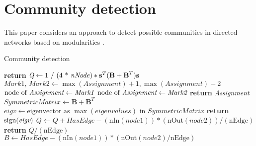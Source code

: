 \chapter[Short Chap title]{Community detection}
This paper considers an approach to detect possible communities in directed networks based on modularities \cite{PhysRevLett.100.118703}.

\begin{algorithm}[H]
	\caption{Community detection}\label{alg:communitydetection}
	\begin{algorithmic}[1]
		\State \textbf{return} \emph{$\textit{Q} \gets \text{1 / (4 * \textit{nNode})} * \textbf{s}^T(\textbf{B}+\textbf{B}^T)\textbf{s}$}
		\EndProcedure
		\State $\textit{Mark1, Mark2} \gets \max( \textit{Assignment})+1, \max( \textit{Assignment})+2$
		 {$\text{node of } \textit{Assignment} \gets \emph{Mark1}$}
		\EndIf
		 {$\text{node of } \textit{Assignment} \gets \emph{Mark2}$}
		\EndIf
		\EndFor
		\State \textbf{return} \emph{Assignment}
		\EndProcedure
		\State $\textit{SymmetricMatrix} \gets  \textbf{B}+\textbf{B}^T$
		\State $\textit{eigv} \gets \text{eigenvector as }\max(eigenvalues) \text{ in } \textit{SymmetricMatrix}$
		\State \textbf{return} $\operatorname{sign}(\textit{eigv})$
		\EndProcedure
		\State $Q \gets Q + HasEdge - (\text{nIn}( \textit{node1}))*(\text{nOut}(\textit{node2}))/ (\text{nEdge})$
		\EndIf
		\EndFor
		\EndFor
		\State \textbf{return} \emph{$Q / (\text{nEdge})$}
		\EndProcedure
		\State $\textit{B} \gets \textit{HasEdge} - (\text{nIn}( \textit{node1}))*(\text{nOut}( \textit{node2})/\text{nEdge})$

\end{algorithmic}
\end{algorithm}
